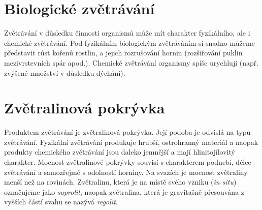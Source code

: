 \section{Biologické zvětrávání}
Zvětrávání v důsledku činnosti organismů může mít charakter fyzikálního, ale i chemické zvětrávání. Pod fyzikálním biologickým zvětráváním si snadno můžeme představit růst kořenů rostlin, a jejich rozrušování hornin (rozšiřování puklin mezivrstevních spár apod.). 
Chemické zvětrávání organismy spíše urychlují (např. zvýšené množství  v důsledku dýchání). 

\section{Zvětralinová pokrývka}
Produktem zvětrávání je zvětralinová pokrývka. Její podoba je odvislá na typu zvětrávání. Fyzikální zvětrávání produkuje hrubší, ostrohranný materiál a naopak produkty chemického zvětrávání jsou daleko jemnější a mají hlinitojílovitý charakter. Mocnost zvětralinové pokrývky souvisí s charakterem podnebí, délce zvětrávání a samozřejmě s odolností horniny. Na svazích je mocnost zvětraliny menší než na rovinách. Zvětralinu, která je na místě svého vzniku (\textit{in situ}) označujeme jako \emph{saprolit}, naopak zvětralina, která je gravitašně přesouvána z vyšších částí svahu se nazývá \emph{regolit}.

%
%
%
%

